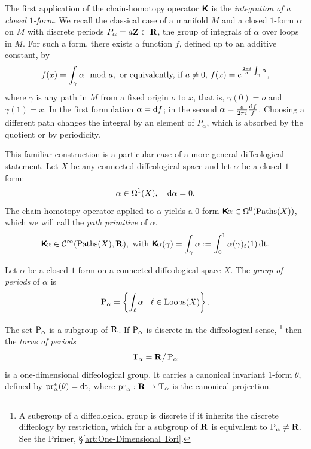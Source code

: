 \documentclass[10pt,reqno,letterpaper,twoside]{amsbook}
\begin{document}
  \begin{article}
    \label{art: Integration of Closed 1-forms}
    The first application of the chain-homotopy operator $\boldsymbol{\mathsf{K}}$ is the
    \emph{integration of a closed $1$-form}.
    We recall the classical case of a manifold $M$ and a closed $1$-form $\alpha$ on $M$
    with discrete periods $P_\alpha = a {\mathbf{Z}} \subset {\mathbf{R}}$,
    the group of integrals of $\alpha$ over loops in $M$.
    For such a form,
    there exists a function $f$, defined up to an additive constant, by
    \[
      f(x) = \int_\gamma \alpha \mod a,
      \ \text{or equivalently, if $a \neq 0$,}\ 
      f(x) = e^{\frac{2\pi i}{a}\int_\gamma \alpha},
      \]%
    where $\gamma$ is any path in $M$ from a fixed origin $o$ to $x$,
    that is, $\gamma(0) = o$ and $\gamma(1) = x$.
    In the first formulation $\alpha = \mathrm{d} f$;
    in the second $\alpha = \frac{a}{2\pi i}\frac{\mathrm{d} f}{f}$.
    Choosing a different path changes the integral by an element of $P_\alpha$,
    which is absorbed by the quotient or by periodicity.
    
    This familiar construction is a particular case of a more general
    diffeological statement.
    Let $X$ be any connected diffeological space and let $\alpha$ be a closed $1$-form:
    \[
      \alpha \in \Omega^1(X),
      \quad
      \mathrm{d}\alpha = 0.
      \]%
    The chain homotopy operator applied to $\alpha$ yields a $0$-form $\boldsymbol{\mathsf{K}}\!\alpha \in \Omega^0(\operatorname{Paths}(X))$,
    which we will call the \emph{path primitive} of $\alpha$.
    \[
      \boldsymbol{\mathsf{K}}\!\alpha \in {\mathcal{C}}^\infty(\operatorname{Paths}(X),{\mathbf{R}}),
      \ \text{with}\ 
      \boldsymbol{\mathsf{K}}\!\alpha(\gamma) = \int_\gamma \alpha := \int_0^1 \alpha(\gamma)_t(1)\, \mathrm{dt}.
      \]%
    
    \begin{definition}
      Let $\alpha$ be a closed $1$-form on a connected diffeological space $X$.
      The \emph{group of periods} of $\alpha$ is
      \[
        \operatorname{P}_\alpha = \left\{ \int_\ell \alpha \;\Big|\; \ell \in \operatorname{Loops}(X) \right\}.
        \]%
    \end{definition}
    
    \begin{proposition}[1]
      The set $\operatorname{P}_\alpha$ is a subgroup of ${\mathbf{R}}$.
      If $\operatorname{P}_\alpha$ is discrete in the diffeological sense,%
      \footnote{A subgroup of a diffeological group is discrete if it inherits the
      discrete diffeology by restriction,
      which for a subgroup of ${\mathbf{R}}$ is equivalent to $\operatorname{P}_\alpha \neq {\mathbf{R}}$.
      See the Primer, \S\ref{art:One-Dimensional Tori}.}
      then the \emph{torus of periods}
      \[
        \mathrm{T}_\alpha = {\mathbf{R}}/\operatorname{P}_\alpha
        \]%
      is a one-dimensional diffeological group.
      It carries a canonical invariant $1$-form $\theta$,
      defined by $\Proj_\alpha^*(\theta) = \dt$,
      where $\Proj_\alpha: \fieldR \to \Torus_\alpha$ is the canonical projection.
    \end{proposition}
    

\end{article}
\end{document}
